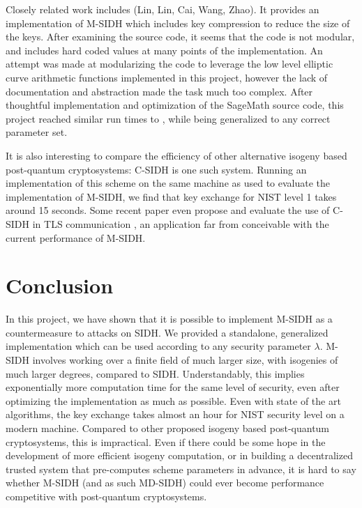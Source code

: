 \documentclass[a4paper,11pt,oneside]{report}
\begin{document}
Closely related work includes \cite{compression} (Lin, Lin, Cai, Wang, Zhao). It provides an implementation of M-SIDH which includes key compression to reduce the size of the keys. After examining the source code, it seems that the code is not modular, and includes hard coded values at many points of the implementation. An attempt was made at modularizing the code to leverage the low level elliptic curve arithmetic functions implemented in this project, however the lack of documentation and abstraction made the task much too complex. After thoughtful implementation and optimization of the SageMath source code, this project reached similar run times to \cite{compression}, while being generalized to any correct parameter set. 

It is also interesting to compare the efficiency of other alternative isogeny based post-quantum cryptosystems: C-SIDH \cite{csidh} is one such system. Running an implementation of this scheme \cite{sibc} on the same machine as used to evaluate the implementation of M-SIDH, we find that key exchange for NIST level 1 takes around 15 seconds. Some recent paper even propose and evaluate the use of C-SIDH in TLS communication \cite{csidh-tls}, an application far from conceivable with the current performance of M-SIDH.




\chapter{Conclusion}

In this project, we have shown that it is possible to implement M-SIDH as a countermeasure to attacks on SIDH. We provided a standalone, generalized implementation which can be used according to any security parameter $\lambda$. M-SIDH involves working over a finite field of much larger size, with isogenies of much larger degrees, compared to SIDH. Understandably, this implies exponentially more computation time for the same level of security, even after optimizing the implementation as much as possible. Even with state of the art algorithms, the key exchange takes almost an hour for NIST security level on a modern machine. Compared to other proposed isogeny based post-quantum cryptosystems, this is impractical. Even if there could be some hope in the development of more efficient isogeny computation, or in building a decentralized trusted system that pre-computes scheme parameters in advance, it is hard to say whether M-SIDH (and as such MD-SIDH) could ever become performance competitive with post-quantum cryptosystems.
\end{document}
